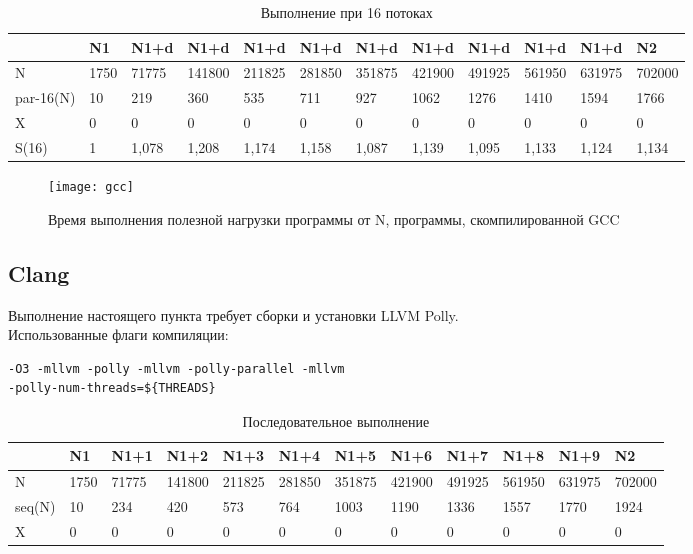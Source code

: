 \documentclass[a4paper,14pt,russian]{extarticle}
\begin{document}
\begin{table}[h]
	\caption{Выполнение при 16 потоках}
	\label{gcc-16}
	\begin{adjustbox}{width=\textwidth,nofloat=table}
		\begin{tabular}{|l|l|l|l|l|l|l|l|l|l|l|l|}
			\hline
			& N1   & N1+d  & N1+d   & N1+d   & N1+d   & N1+d   & N1+d   & N1+d   & N1+d   & N1+d   & N2     \\ \hline
			N         & 1750 & 71775 & 141800 & 211825 & 281850 & 351875 & 421900 & 491925 & 561950 & 631975 & 702000 \\ \hline
			par-16(N) & 10   & 219   & 360    & 535    & 711    & 927    & 1062   & 1276   & 1410   & 1594   & 1766   \\ \hline
			X         & 0    & 0     & 0      & 0      & 0      & 0      & 0      & 0      & 0      & 0      & 0      \\ \hline
			S(16)   & 1    & 1,078 & 1,208  & 1,174  & 1,158  & 1,087  & 1,139  & 1,095  & 1,133  & 1,124  & 1,134  \\ \hline
		\end{tabular}
	\end{adjustbox}
\end{table}


\begin{figure}[H]
	\centering
	\texttt{[image: gcc]}
	\caption{Время выполнения полезной нагрузки программы от N, программы, скомпилированной GCC}
	\label{pic:gcc}
\end{figure}


\subsection{Clang}

Выполнение настоящего пункта требует сборки и установки LLVM Polly.\\

Использованные флаги компиляции:
\begin{lstlisting}
-O3 -mllvm -polly -mllvm -polly-parallel -mllvm
-polly-num-threads=${THREADS}
\end{lstlisting}

\begin{table}[H]
	\caption{Последовательное выполнение}
	\label{clang-seq}
	\begin{adjustbox}{width=\textwidth,nofloat=table}
		\begin{tabular}{|l|l|l|l|l|l|l|l|l|l|l|l|}
			\hline
			& N1   & N1+1  & N1+2   & N1+3   & N1+4   & N1+5   & N1+6   & N1+7   & N1+8   & N1+9   & N2     \\\hline
N       & 1750  & 71775 & 141800 & 211825 & 281850 & 351875 & 421900 & 491925 & 561950 & 631975 & 702000 \\ \hline
seq(N)  & 10    & 234   & 420    & 573    & 764    & 1003   & 1190   & 1336   & 1557   & 1770   & 1924   \\ \hline
X       & 0     & 0     & 0      & 0      & 0      & 0      & 0      & 0      & 0      & 0      & 0      \\ \hline
		\end{tabular}
	\end{adjustbox}
\end{table}
\end{document}
